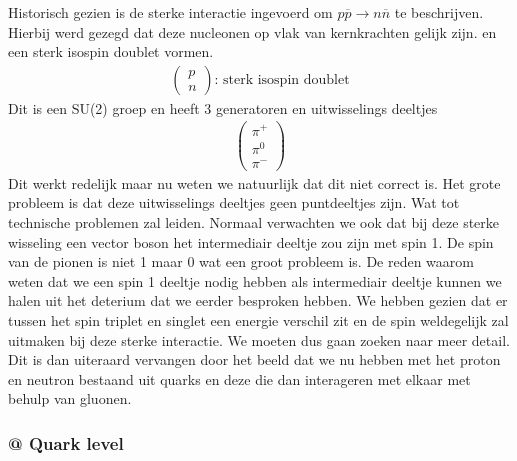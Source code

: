 \documentclass[../main.tex]{subfiles}
\begin{document}
Historisch gezien is de sterke interactie ingevoerd om $p\overline p \rightarrow n\overline n$ te beschrijven. Hierbij werd gezegd dat deze nucleonen op vlak van kernkrachten gelijk zijn. en een sterk isospin doublet vormen.
\begin{equation}
    \begin{aligned}
        \label{eq:nucleon_doublet}
        \begin{pmatrix}
            p\\
            n
        \end{pmatrix}
        \text{: sterk isospin doublet}
    \end{aligned}
\end{equation}
Dit is een SU(2) groep en heeft 3 generatoren en uitwisselings deeltjes
\begin{equation}
    \begin{aligned}
        \label{eq:isospin_uitwisseling_deeltjes}
        \begin{pmatrix}
            \pi^+\\
            \pi^0\\
            \pi^-
        \end{pmatrix}
    \end{aligned}
\end{equation}
Dit werkt redelijk maar nu weten we natuurlijk dat dit niet correct is. Het grote probleem is dat deze uitwisselings deeltjes geen puntdeeltjes zijn. Wat tot technische problemen zal leiden. Normaal verwachten we ook dat bij deze sterke wisseling een vector boson het intermediair deeltje zou zijn met spin 1. De spin van de pionen is niet 1 maar 0 wat een groot probleem is. De reden waarom weten dat we een spin 1 deeltje nodig hebben als intermediair deeltje kunnen we halen uit het deterium dat we eerder besproken hebben. We hebben gezien dat er tussen het spin triplet en singlet een energie verschil zit en de spin weldegelijk zal uitmaken bij deze sterke interactie. We moeten dus gaan zoeken naar meer detail. Dit is dan uiteraard vervangen door het beeld dat we nu hebben met het proton en neutron bestaand uit quarks en deze die dan interageren met elkaar met behulp van gluonen.

\subsubsection{@ Quark level}%
\label{ssub:_quark_level}
\end{document}

